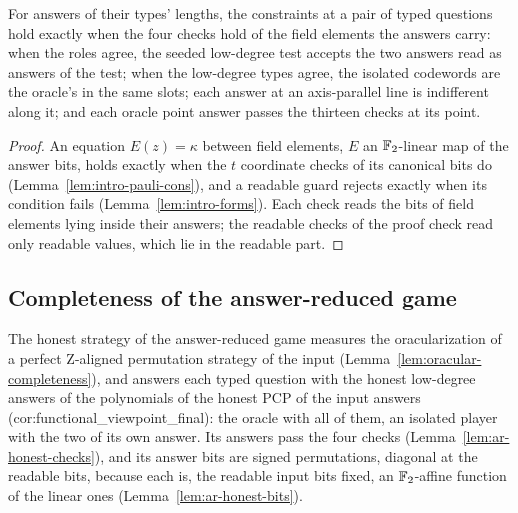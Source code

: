 \begin{lemma}
\label{lem:ar-tailored-reading}
\leanok
For answers of their types' lengths, the constraints at a pair of typed questions hold exactly
when the four checks hold of the field elements the answers carry: when the roles agree, the
seeded low-degree test accepts the two answers read as answers of the test; when the low-degree
types agree, the isolated codewords are the oracle's in the same slots; each answer at an
axis-parallel line is indifferent along it; and each oracle point answer passes the thirteen
checks at its point.
\end{lemma}

\begin{proof}
\leanok
An equation $E(z) = \kappa$ between field elements, $E$ an $\mathbb{F}_2$-linear map of the answer bits,
holds exactly when the $t$ coordinate checks of its canonical bits do
(Lemma~\ref{lem:intro-pauli-cons}), and a readable guard rejects exactly when its condition fails
(Lemma~\ref{lem:intro-forms}). Each check reads the bits of field elements lying inside their
answers; the readable checks of the proof check read only readable values, which lie in the
readable part.
\end{proof}


\subsection{Completeness of the answer-reduced game}

The honest strategy of the answer-reduced game measures the oracularization of a perfect
Z-aligned permutation strategy of the input (Lemma~\ref{lem:oracular-completeness}), and answers
each typed question with the honest low-degree answers of the polynomials of the honest PCP of the
input answers (cor:functional\_viewpoint\_final): the oracle with all of them, an isolated player
with the two of its own answer. Its answers pass the four checks
(Lemma~\ref{lem:ar-honest-checks}), and its answer bits are signed permutations, diagonal at the
readable bits, because each is, the readable input bits fixed, an $\mathbb{F}_2$-affine function of the
linear ones (Lemma~\ref{lem:ar-honest-bits}).

